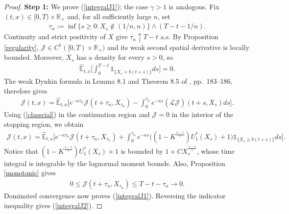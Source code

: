 \documentclass[a4paper,11pt]{amsart}
\numberwithin{equation}{section}
\begin{document}
{{{\begin{proof}
\textbf{Step 1:} We prove (\ref{integralJ1}); the case $\gamma>1$ is analogous. Fix $(t,x)\in[0,T)\times\mathbb R_+$ and, for all sufficiently large $n$, set
\begin{align*}
\tau_n:=\inf\{s\geq0:X_s\notin(1/n,n)\}\wedge(T-t-1/n).
\end{align*}
Continuity and strict positivity of $X$ give $\tau_n\uparrow T-t$ a.s. By Proposition \ref{regularity}, $\mathcal J\in C^1([0,T)\times\mathbb R_+)$ and its weak second spatial derivative is locally bounded. Moreover, $X_s$ has a density for every $s>0$, so
\begin{align*}
\widehat{\mathbb E}_{t,x}\bigg[\int_0^{T-t}\mathds{1}_{\{X_s=\overline b(t+s)\}}ds\bigg]=0.
\end{align*}
 The weak Dynkin formula in Lemma 8.1 and Theorem 8.5 of \citet{bensoussan2011applications}, pp.\ 183--186, therefore gives
\begin{align*}
\mathcal J(t,x)=\widehat{\mathbb E}_{t,x}\bigg[e^{-\kappa\tau_n}\mathcal J(t+\tau_n,X_{\tau_n})-\int_0^{\tau_n}e^{-\kappa s}(\overline{\mathcal L}\mathcal J)(t+s,X_s)ds\bigg].
\end{align*}
Using (\ref{classcial}) in the continuation region and $\mathcal J=0$ in the interior of the stopping region, we obtain
\begin{align*}
\mathcal J(t,x)=\widehat{\mathbb E}_{t,x}\bigg[e^{-\kappa\tau_n}\mathcal J(t+\tau_n,X_{\tau_n})
+\int_0^{\tau_n}e^{-\kappa s}\Big((1-K^{\frac{1-\gamma}{\gamma}})U_1^\ast(X_s)+1\Big)\mathds{1}_{\{X_s\geq\overline b(t+s)\}}ds\bigg].
\end{align*}
Notice that $(1-K^{\frac{1-\gamma}{\gamma}})U_1^\ast(X_s)+1$ is bounded by $1+CX_s^{\frac{\gamma-1}{\gamma}}$, whose time integral is integrable by the lognormal moment bounds. Also, Proposition \ref{monotonic} gives
\begin{align*}
0\leq\mathcal J(t+\tau_n,X_{\tau_n})\leq T-t-\tau_n\longrightarrow0.
\end{align*}
Dominated convergence now proves (\ref{integralJ1}). Reversing the indicator inequality gives (\ref{integralJ2}).


\end{proof}}}}
\end{document}
